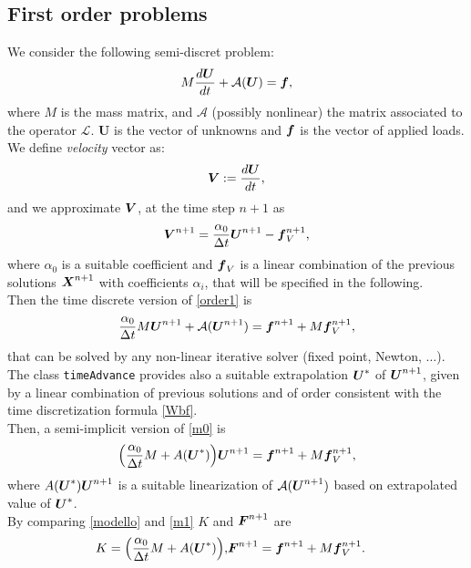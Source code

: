 \documentclass[english,a4paper]{article}
\newcommand{\Xbf}{\text{\mbox{\boldmath $X$}}}
\newcommand{\Ubf}{\text{\mbox{\boldmath $U$}}}
\newcommand{\fbf}{\text{\mbox{\boldmath $f$}}}
\newcommand{\Fbf}{\text{\mbox{\boldmath $F$}}}
\newcommand{\Wbf}{\text{\mbox{\boldmath $V$}}}
\newcommand{\xx}{\boldsymbol}
\begin{document}
\subsection{First  order problems}
We consider the following semi-discret problem:
\begin{equation}\label{order1}
M\frac{d \xx U }{dt} +\mathcal{A}(\xx U) = \fbf ,
\end{equation}
where $M$ is  the mass matrix, and $\mathcal{A}$ (possibly nonlinear) the
matrix associated to the operator $\mathcal{L}$.  $\xx U$ is the
 vector  of unknowns and $\fbf$ is the vector of applied loads.\\
We define {\sl velocity} vector as:
\[
\Wbf:=\frac{d\xx U}{dt},
\]
and we approximate $\Wbf$, at the time step $n+1$ as
\begin{equation}\label{Wbf}
\Wbf^{n+1}=\frac{\alpha_0}{\Delta t}\Ubf^{n+1}- \fbf_V^{n+1},
\end{equation}
where $\alpha_0$ is a suitable coefficient and $\fbf_V$  is a
linear combination of the previous  solutions $\Xbf^{n+1}$ with coefficients
$\alpha_i$, that  will be specified in the following.\\
Then the time discrete version of \eqref{order1} is
\begin{equation}\label{m0}
\frac{\alpha_0}{\Delta t}M\Ubf^{n+1}  +\mathcal{A}(\Ubf^{n+1})=\fbf^{n+1}+ M \fbf_V^{n+1},
\end{equation}
that can be solved by any non-linear iterative solver (fixed point,
Newton, $\dots$). The class \verb"timeAdvance" provides also a
suitable extrapolation $\Ubf^*$ of  $\Ubf^{n+1}$, given by a linear
combination of previous solutions and of order consistent with the
time discretization formula \eqref{Wbf}.\\
Then, a semi-implicit version of
\eqref{m0} is
\begin{equation}\label{m1}
\Big(\frac{\alpha_0}{\Delta t} M +A(\Ubf^*)\Big)\Ubf^{n+1}=\fbf^{n+1}+ M \fbf_V^{n+1},
\end{equation}
where $A(\Ubf^*)\Ubf^{n+1}$ is a suitable linearization of
$\mathcal{A}(\Ubf^{n+1})$ based on extrapolated value  of $\Ubf^*$.\\
By comparing \eqref{modello} and \eqref{m1}  $K$ and $\Fbf^{n+1}$ 
are 
\begin{eqnarray*}
\displaystyle K =\Big(\frac{\alpha_0}{\Delta t} M +A(\Ubf^*)\Big),& \xx F^{n+1}=\xx f^{n+1} + M \fbf_V^{n+1}.
\end{eqnarray*}
\end{document}
